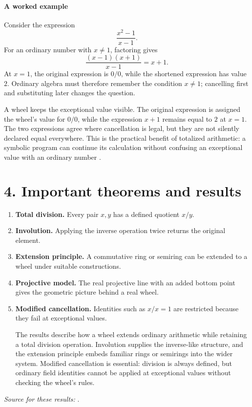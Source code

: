 \paragraph{A worked example}
Consider the expression
\[
 \frac{x^2-1}{x-1}.
\]
For an ordinary number with $x\ne1$, factoring gives
\[
 \frac{(x-1)(x+1)}{x-1}=x+1.
\]
At $x=1$, the original expression is $0/0$, while the shortened expression
has value $2$. Ordinary algebra must therefore remember the condition
$x\ne1$; cancelling first and substituting later changes the question.

A wheel keeps the exceptional value visible. The original expression is
assigned the wheel's value for $0/0$, while the expression $x+1$ remains
equal to $2$ at $x=1$. The two expressions agree where cancellation is
legal, but they are not silently declared equal everywhere. This is the
practical benefit of totalized arithmetic: a symbolic program can continue
its calculation without confusing an exceptional value with an ordinary
number \cite{wheel_ref1,wheel_ref2}.

\section*{4. Important theorems and results}
\begin{enumerate}[leftmargin=*,itemsep=0.35em]
\item \textbf{Total division.} Every pair $x,y$ has a defined quotient $x/y$.

\item \textbf{Involution.} Applying the inverse operation twice returns the original element.

\item \textbf{Extension principle.} A commutative ring or semiring can be extended to a wheel under suitable constructions.

\item \textbf{Projective model.} The real projective line with an added bottom point gives the geometric picture behind a real wheel.

\item \textbf{Modified cancellation.} Identities such as $x/x=1$ are restricted because they fail at exceptional values.

The results describe how a wheel extends ordinary arithmetic while retaining a total division operation. Involution supplies the inverse-like structure, and the extension principle embeds familiar rings or semirings into the wider system. Modified cancellation is essential: division is always defined, but ordinary field identities cannot be applied at exceptional values without checking the wheel's rules.
\end{enumerate}
\noindent\emph{Source for these results:} \cite{wheel_ref1}.

